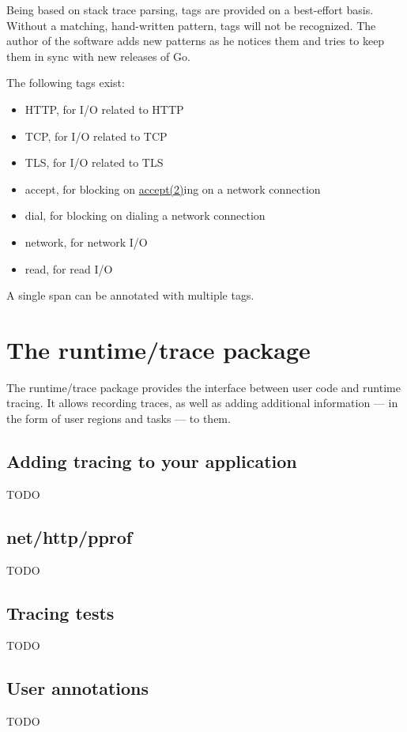 \documentclass[10pt,letterpaper,oneside,openany,showtrims]{memoir}
\newcommand{\code}[1]{{\ttfamily\mbox{#1}}}
\newcommand{\todo}[1]{{\color{red}#1}}
\begin{document}
Being based on stack trace parsing, tags are provided on a best-effort basis.
Without a matching, hand-written pattern, tags will not be recognized.
The author of the software adds new patterns as he notices them and tries to keep them in sync with new releases of Go.

The following tags exist:

\begin{itemize}
\item HTTP, for I/O related to HTTP
\item TCP, for I/O related to TCP
\item TLS, for I/O related to TLS
\item accept, for blocking on \href{https://man7.org/linux/man-pages/man2/accept.2.html}{accept(2)}ing on a network connection
\item dial, for blocking on dialing a network connection
\item network, for network I/O
\item read, for read I/O
\end{itemize}

A single span can be annotated with multiple tags.

\chapter{The \code{runtime/trace} package}

The \code{runtime/trace} package provides the interface between user code and runtime tracing.
It allows recording traces, as well as adding additional information --- in the form of user regions and tasks --- to them.

\section{Adding tracing to your application}
\todo{TODO}

\section{\code{net/http/pprof}}
\todo{TODO}

\section{Tracing tests}
\todo{TODO}

\section{User annotations}
\todo{TODO}
\end{document}
